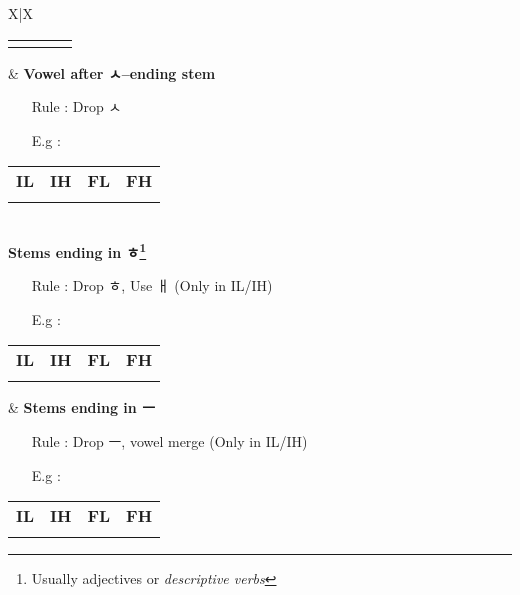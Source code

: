 \begin{tabularx}{\linewidth}{X|X}
\begin{tabular}{c|c|c|c}
            \rom{달라}{dalla} & \rom{달라요}{dallayo} & \rom{다른다}{daleunda} & \rom{다릅니다}{daleubnida} 
        \end{tabular}
    & \textbf{Vowel after ㅅ--ending stem}
        \begin{itemize}
            \item [Rule]: Drop ㅅ
            \item [E.g]: 
        \end{itemize}
        \begin{tabular}{c|c|c|c}
            \textbf{IL} & \textbf{IH} & \textbf{FL} & \textbf{FH} \\
            \rom{나아}{naa} & \rom{나아요}{naayo} & \rom{낫는다}{nasneunda} & \rom{낫습니다}{nasseubnida}
        \end{tabular}
    \\ \hline
    \textbf{Stems ending in ㅎ\footnote{Usually adjectives or \textit{descriptive verbs}}}
        \begin{itemize}
            \item [Rule]: Drop ㅎ, Use ㅐ (Only in IL/IH)
            \item [E.g]: 
        \end{itemize}
        \begin{tabular}{c|c|c|c}
            \textbf{IL} & \textbf{IH} & \textbf{FL} & \textbf{FH} \\
            \rom{하얘}{hayae} & \rom{하얘요}{hayaeyo} & \rom{하얗다}{hayahneunda} & \rom{하얗습니다}{hayahseubnida} 
        \end{tabular}
    & \textbf{Stems ending in ㅡ}
        \begin{itemize}
            \item [Rule]: Drop ㅡ, vowel merge (Only in IL/IH)
            \item [E.g]: 
        \end{itemize}
        \begin{tabular}{c|c|c|c}
            \textbf{IL} & \textbf{IH} & \textbf{FL} & \textbf{FH} \\
            \rom{써}{sseo} & \rom{써요}{sseoyo} & \rom{쓴다}{sseunda} & \rom{씁니다}{sseubnida} 
        \end{tabular}
\end{tabularx}
